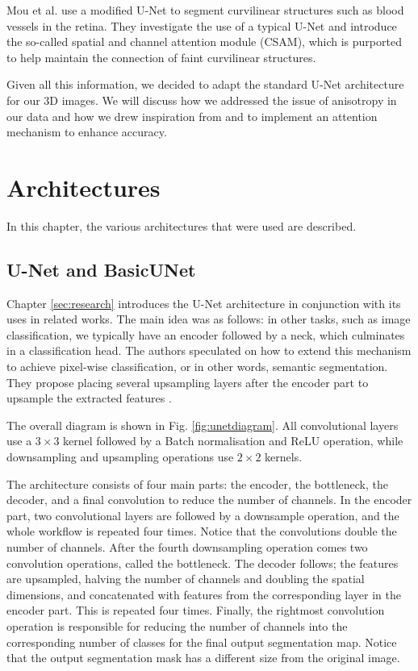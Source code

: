 \documentclass[
  digital,     %
  oneside,     %
  nosansbold,  %
  nocolorbold, %
  lof,         %
  lot,         %
]{fithesis4}
\begin{document}
Mou et al. \parencite{Mou2021} use a modified U-Net to segment curvilinear structures such as blood vessels in the retina. They investigate the use of a typical U-Net and introduce the so-called spatial and channel attention module (CSAM), which is purported to help maintain the connection of faint curvilinear structures.

Given all this information, we decided to adapt the standard U-Net architecture for our 3D images. We will discuss how we addressed the issue of anisotropy in our data and how we drew inspiration from \parencite{Mou2021} and \parencite{Ceran2022TNTdetect} to implement an attention mechanism to enhance accuracy.

\chapter{Architectures}
In this chapter, the various architectures that were used are described.

\section{U-Net and BasicUNet}
\label{sec:unet}

Chapter \ref{sec:research} introduces the U-Net architecture in conjunction with its uses in related works. The main idea was as follows: in other tasks, such as image classification, we typically have an encoder followed by a neck, which culminates in a classification head. The authors speculated on how to extend this mechanism to achieve pixel-wise classification, or in other words, semantic segmentation. They propose placing several upsampling layers after the encoder part to upsample the extracted features \parencite{Ronneberger2015}.

The overall diagram is shown in Fig. \ref{fig:unetdiagram}. All convolutional layers use a $3 \times 3$ kernel followed by a Batch normalisation and ReLU operation, while downsampling and upsampling operations use $2 \times 2$ kernels.

The architecture consists of four main parts: the encoder, the bottleneck, the decoder, and a final convolution to reduce the number of channels. In the encoder part, two convolutional layers are followed by a downsample operation, and the whole workflow is repeated four times. Notice that the convolutions double the number of channels. After the fourth downsampling operation comes two convolution operations, called the bottleneck. The decoder follows; the features are upsampled, halving the number of channels and doubling the spatial dimensions, and concatenated with features from the corresponding layer in the encoder part. This is repeated four times. Finally, the rightmost convolution operation is responsible for reducing the number of channels into the corresponding number of classes for the final output segmentation map. Notice that the output segmentation mask has a different size from the original image.
\end{document}
